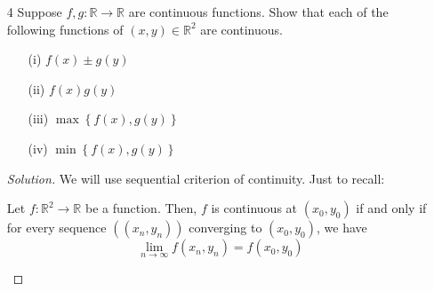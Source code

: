 \documentclass[12pt]{article}
\theoremstyle{definition}
\newenvironment{soln}{\begin{proof}[Solution]}{\end{proof}}
\begin{document}
\begin{enumerate}[leftmargin=*]
\begin{enumerate}[leftmargin=*]
\begin{soln}
            For $c = 0$, the level set is the union of the $x$ and $y$ axes in the $xy$-plane. Precisely, this is the set $L = \left\{ (x,y) \in \mathbb{R}^2 \mid  x = 0 \text{ or } y =0\right\}$. The contour line corresponding to $c=0$ is the union of the $x$ and $y$ axes in the $xyz$-space. This is the set $L \times \{0\}$. For any non-zero $c$, the level curve is the rectangular hyperbola $xy = c$ and the contour line is the cross-section of the hyperboloid $z = xy$ by the plane $z=c$. More precisely, the level curve is the set $L = \left\{ (x,y) \in \mathbb{R}^2 \mid xy = c \right\}$ and the contour line is the set $L \times \{c\}$. For negative $c$, the level curve (and the contour line) has branches in the second and fourth quadrant while for positive $c$, the level curve (and the contour line) has branches in the first and third quadrants.
        \end{soln}
    \end{enumerate}
    
    \newpage
    
    \item[4] Suppose $f,g \colon \mathbb{R} \to \mathbb{R}$ are continuous functions. Show that each of the following functions of $(x,y) \in \mathbb{R}^2$ are continuous. 
    
    \begin{multicols}{2}
        \begin{enumerate}[leftmargin=*]
            \item[(i)] $f(x) \pm g(y)$
            \item[(ii)] $f(x) g(y)$
        \end{enumerate}
    \end{multicols}
    \begin{multicols}{2}
        \begin{enumerate}[leftmargin=*]
            \item[(iii)] $\max\left\{ f(x), g(y) \right\}$
            \item[(iv)] $\min\left\{ f(x), g(y) \right\}$
        \end{enumerate}
    \end{multicols}
    
    \begin{soln}
        We will use sequential criterion of continuity. Just to recall:
        
        \begin{thm*}
            Let $f \colon \mathbb{R}^2 \to \mathbb{R}$ be a function. Then, $f$ is continuous at $(x_0, y_0)$ if and only if for every sequence $\left( (x_n, y_n) \right)$ converging to $(x_0, y_0)$, we have 
            \[
                \lim_{n \to \infty} f\left( x_n, y_n \right) = f(x_0, y_0)
            \]
        \end{thm*}
        

\end{soln}
\end{enumerate}
\end{document}
